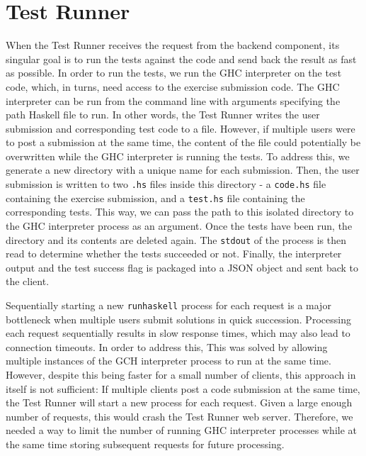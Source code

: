\chapter{Test Runner} \label{chap:TestRunner}
When the Test Runner receives the request from the backend component, its singular goal is to run the tests against the code and send back the result as fast as possible.
In order to run the tests, we run the GHC interpreter on the test code, which, in turns, need access to the exercise submission code.
The GHC interpreter can be run from the command line with arguments specifying the path Haskell file to run.
In other words, the Test Runner writes the user submission and corresponding test code to a file.
However, if multiple users were to post a submission at the same time, the content of the file could potentially be overwritten while the GHC interpreter is running the tests.
To address this, we generate a new directory with a unique name for each submission.
Then, the user submission is written to two  \texttt{.hs} files inside this directory - a \texttt{code.hs} file containing the exercise submission, and a \texttt{test.hs} file containing the corresponding tests.
This way, we can pass the path to this isolated directory to the GHC interpreter process as an argument.
Once the tests have been run, the directory and its contents are deleted again.
The \texttt{stdout} of the process is then read to determine whether the tests succeeded or not.
Finally, the interpreter output and the test success flag is packaged into a JSON object and sent back to the client.

Sequentially starting a new \texttt{runhaskell} process for each request is a major bottleneck when multiple users submit solutions in quick succession.
Processing each request sequentially results in slow response times, which may also lead to connection timeouts.
In order to address this,
This was solved by allowing multiple instances of the GCH interpreter process to run at the same time.
However, despite this being faster for a small number of clients, this approach in itself is not sufficient:
If multiple clients post a code submission at the same time, the Test Runner will start a new process for each request.
Given a large enough number of requests, this would crash the Test Runner web server.
Therefore, we needed a way to limit the number of running GHC interpreter processes while at the same time storing subsequent requests for future processing.



